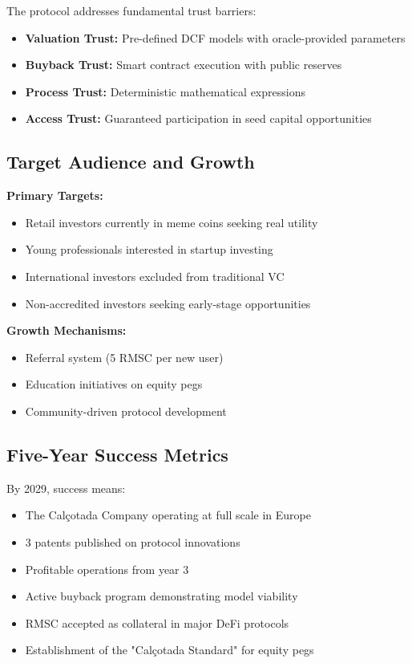 \documentclass[conference]{IEEEtran}
\begin{document}
The protocol addresses fundamental trust barriers:
\begin{itemize}
    \item \textbf{Valuation Trust:} Pre-defined DCF models with oracle-provided parameters
    \item \textbf{Buyback Trust:} Smart contract execution with public reserves
    \item \textbf{Process Trust:} Deterministic mathematical expressions
    \item \textbf{Access Trust:} Guaranteed participation in seed capital opportunities
\end{itemize}

\subsection{Target Audience and Growth}

\textbf{Primary Targets:}
\begin{itemize}
    \item Retail investors currently in meme coins seeking real utility
    \item Young professionals interested in startup investing
    \item International investors excluded from traditional VC
    \item Non-accredited investors seeking early-stage opportunities
\end{itemize}

\textbf{Growth Mechanisms:}
\begin{itemize}
    \item Referral system (5 RMSC per new user)
    \item Education initiatives on equity pegs
    \item Community-driven protocol development
\end{itemize}

\subsection{Five-Year Success Metrics}

By 2029, success means:
\begin{itemize}
    \item The Calçotada Company operating at full scale in Europe
    \item 3 patents published on protocol innovations
    \item Profitable operations from year 3
    \item Active buyback program demonstrating model viability
    \item RMSC accepted as collateral in major DeFi protocols
    \item Establishment of the "Calçotada Standard" for equity pegs
\end{itemize}
\end{document}
